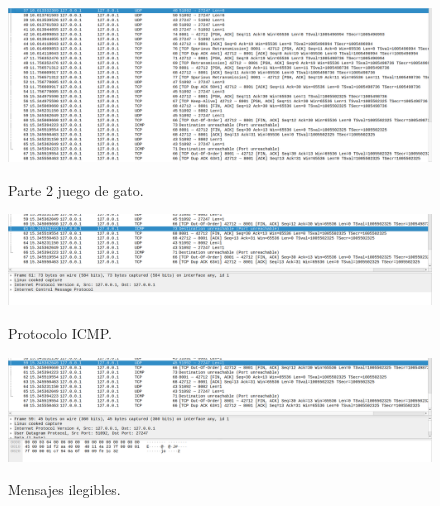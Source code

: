 \documentclass[a4paper,11pt]{article}
\begin{document}
\begin{figure}[h]
    \centering
    {\includegraphics[width = 1.0\textwidth]{imagne-2.png}}
    \caption {Parte 2 juego de gato.}
\end{figure}

\begin{figure}[h]
    \centering
    {\includegraphics[width = 1.0\textwidth]{icmp.png}}
    \caption {Protocolo ICMP.}
\end{figure}

\begin{figure}[h]
    \centering
    {\includegraphics[width = 1.0\textwidth]{ilegible.png}}
    \caption {Mensajes ilegibles.}
\end{figure}

\vspace{.5cm}
\end{document}
